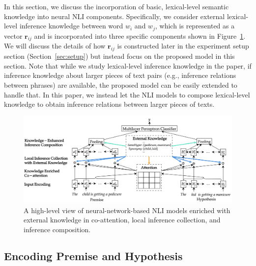 \documentclass[11pt,a4paper]{article}
\newcommand{\vect}[1]{\bm{#1}}
\begin{document}
In this section, we discuss the incorporation of basic, lexical-level semantic knowledge into neural NLI components. Specifically, we consider external lexical-level inference knowledge between word $w_i$ and $w_j$, which is represented as a vector ${\vect r}_{ij}$ and is incorporated into three specific components shown in Figure~\ref{fig:model}. We will discuss the details of how ${\vect r}_{ij}$ is constructed later in the experiment setup section (Section~\ref{sec:setup}) but instead focus on the proposed model in this section. Note that while we study lexical-level inference knowledge in the paper, if inference knowledge about larger pieces of text pairs (e.g., inference relations between phrases) are available, the proposed model can be easily extended to handle that. In this paper, we instead let the NLI models to compose lexical-level knowledge to obtain inference relations between larger pieces of texts. 

\begin{figure}[!htb]
	\centering
	\includegraphics[width=1\linewidth]{model}
	\caption{A high-level view of neural-network-based NLI models enriched with external knowledge in co-attention, local inference collection, and inference composition.}
	\label{fig:model}
\end{figure}

\subsection{Encoding Premise and Hypothesis}
\end{document}
